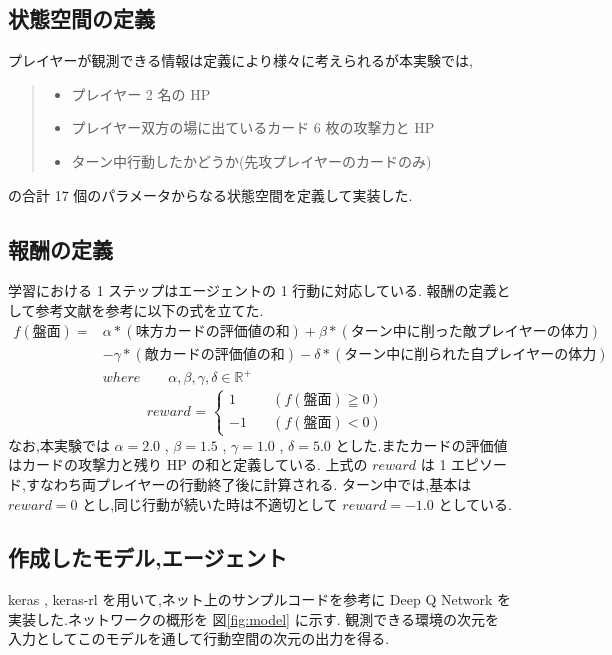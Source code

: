 \documentclass{jarticle}     %
\begin{document}
\subsection{状態空間の定義}
プレイヤーが観測できる情報は定義により様々に考えられるが本実験では,
\begin{quote}
  \begin{itemize}
   \item プレイヤー 2 名の HP
   \item プレイヤー双方の場に出ているカード 6 枚の攻撃力と HP 
   \item ターン中行動したかどうか(先攻プレイヤーのカードのみ)
  \end{itemize}
 \end{quote}
の合計 17 個のパラメータからなる状態空間を定義して実装した.

\subsection{報酬の定義}
学習における 1 ステップはエージェントの 1 行動に対応している.
報酬の定義として参考文献を参考に以下の式を立てた\cite{reward}.
\begin{equation*}
  \begin{split}
    f(\mathrm{盤面}) = 
    &\alpha*\mathrm{(味方カードの評価値の和)}+\beta*\mathrm{(ターン中に削った敵プレイヤーの体力)}\\
   & - \gamma*\mathrm{(敵カードの評価値の和)} - \delta*\mathrm{(ターン中に削られた自プレイヤーの体力)}\\
    &where \qquad \alpha , \beta , \gamma , \delta \in \mathbb{R}^+
  \end{split}
\end{equation*}
\begin{equation*}
  \quad reward \text{ = }
  \left\{
    \begin{aligned}
        1 \quad &(f(\mathrm{盤面}) \geqq 0) \\
        -1 \quad &(f(\mathrm{盤面}) < 0)
    \end{aligned}
    \right.
\end{equation*}
なお,本実験では $\alpha = 2.0$ , $\beta = 1.5$ , $\gamma = 1.0$ , $\delta = 5.0$ とした.またカードの評価値はカードの攻撃力と残り HP の和と定義している.
上式の $reward$ は 1 エピソード,すなわち両プレイヤーの行動終了後に計算される.
ターン中では,基本は $reward = 0$ とし,同じ行動が続いた時は不適切として $reward = -1.0$ としている.

\subsection{作成したモデル,エージェント}
keras , keras-rl を用いて,ネット上のサンプルコード\cite{DQNcode}を参考に Deep Q Network を実装した.ネットワークの概形を 図\ref{fig:model} に示す.
観測できる環境の次元を入力としてこのモデルを通して行動空間の次元の出力を得る.\par
\end{document}
